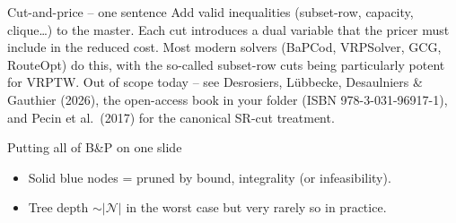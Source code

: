 \documentclass[10pt,aspectratio=169]{beamer}
\begin{document}
\begin{frame}{Cut-and-price -- one sentence}
  Add valid inequalities (subset-row, capacity, clique\dots) to the master.
  Each cut introduces a dual variable that the pricer must include in the
  reduced cost. Most modern solvers (BaPCod, VRPSolver, GCG, RouteOpt) do
  this, with the so-called \alert{subset-row cuts} being particularly potent
  for VRPTW. Out of scope today -- see
  Desrosiers, L\"ubbecke, Desaulniers \& Gauthier (2026), the open-access
  book in your folder (ISBN 978-3-031-96917-1), and Pecin et al.\ (2017) for
  the canonical SR-cut treatment.
\end{frame}

\begin{frame}{Putting all of B\&P on one slide}
  \begin{itemize}\small
    \item Solid blue nodes = pruned by bound, integrality (or infeasibility).
    \item Tree depth $\sim |\mathcal N|$ in the worst case but very rarely so
          in practice.
  \end{itemize}
\end{frame}
\end{document}
